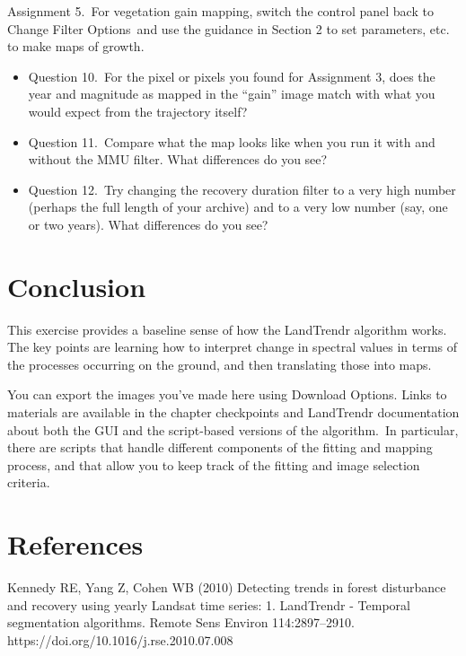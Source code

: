 \documentclass[
  letterpaper,
  DIV=11,
  numbers=noendperiod]{scrreprt}
\providecommand{\tightlist}{%
  \setlength{\itemsep}{0pt}\setlength{\parskip}{0pt}}\usepackage{longtable,booktabs,array}
\begin{document}
Assignment 5.~For vegetation gain mapping, switch the control panel back
to Change Filter Options~and use the guidance in Section 2 to set
parameters, etc. to make maps of growth.

\begin{itemize}
\tightlist
\item
  Question 10.~For the pixel or pixels you found for Assignment 3, does
  the year and magnitude as mapped in the ``gain'' image match with what
  you would expect from the trajectory itself?
\item
  Question 11.~Compare what the map looks like when you run it with and
  without the MMU filter. What differences do you see?
\item
  Question 12.~Try changing the recovery duration filter to a very high
  number (perhaps the full length of your archive) and to a very low
  number (say, one or two years). What differences do you see?~
\end{itemize}

\hypertarget{conclusion-12}{%
\section*{Conclusion}\label{conclusion-12}}


This exercise provides a baseline sense of how the LandTrendr algorithm
works. The key points are learning how to interpret change in spectral
values in terms of the processes occurring on the ground, and then
translating those into maps.

You can export the images you've made here using Download Options. Links
to materials are available in the chapter checkpoints and LandTrendr
documentation about both the GUI and the script-based versions of the
algorithm.~In particular, there are scripts that handle different
components of the fitting and mapping process, and that allow you to
keep track of the fitting and image selection criteria.

\hypertarget{references-8}{%
\section*{References}\label{references-8}}


Kennedy RE, Yang Z, Cohen WB (2010) Detecting trends in forest
disturbance and recovery using yearly Landsat time series: 1. LandTrendr
- Temporal segmentation algorithms. Remote Sens Environ 114:2897--2910.
https://doi.org/10.1016/j.rse.2010.07.008
\end{document}
